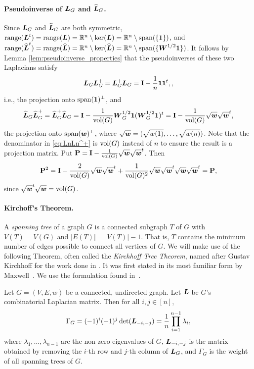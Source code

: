 \paragraph{Pseudoinverse of \texorpdfstring{$\vb*{L}_G$}{the combinatorial} and \texorpdfstring{$\widehat{\vb*{L}}_G$}{normalized Laplacian}.}
Since $\vb*{L}_G$ and $\widehat{\vb*{L}}_G$ are both symmetric, $\textnormal{range}(\vb*{L}^t)=\textnormal{range}(\vb*{L})=\mathbb{R}^n \setminus \ker(\vb*{L})=\mathbb{R}^n \setminus \textnormal{span}(\{\vb{1}\})$, and $\textnormal{range}(\widehat{\vb*{L}}^t)=\textnormal{range}(\widehat{\vb*{L}})=\mathbb{R}^n \setminus \ker(\widehat{\vb*{L}})=\mathbb{R}^n \setminus \textnormal{span}(\{\vb*{W}^{1/2}\vb{1}\})$. It follows by Lemma \ref{lem:pseudoinverse_properties} that the pseudoinverses of these two Laplacians satisfy
\begin{equation}
\label{eq:LL^+}
\vb*{L}_G\vb*{L}_G^+ = \vb*{L}_G^+\vb*{L}_G = \vb{I} - \frac{1}{n}\vb{1}\vb{1}^t,,
\end{equation}
i.e., the projection onto $\textnormal{span}(\vb{1})^\perp$, and 
\begin{equation}
\label{eq:LnLn^+}
\widehat{\vb*{L}}_G\widehat{\vb*{L}}_G^+ = \widehat{\vb*{L}}_G^+\widehat{\vb*{L}}_G = \vb{I} - \frac{1}{\textnormal{vol}(G)}\vb*{W}_G^{1/2}\vb{1}(\vb*{W}_G^{1/2}\vb{1})^t = \vb{I}-\frac{1}{\textnormal{vol}(G)}\sqrt{\vb*{w}}\sqrt{\vb*{w}}^t,
\end{equation}
the projection onto $\textnormal{span}(\vb*{w})^\perp$, where $\sqrt{\vb*{w}}=(\sqrt{w(1)},\dots,\sqrt{w(n)})$. Note that the denominator in \eqref{eq:LnLn^+} is $\textnormal{vol}(G)$ instead of $n$ to ensure the result is a projection matrix. Put $\vb{P} = \vb{I}-\frac{1}{\textnormal{vol}(G)}\sqrt{\vb*{w}}\sqrt{\vb*{w}}^t$. Then 
\begin{align*}
\vb{P}^2 = \vb{I} - \frac{2}{\textnormal{vol}(G)}\sqrt{\vb*{w}}\sqrt{\vb*{w}}^t + \frac{1}{\textnormal{vol}(G)^2}\sqrt{\vb*{w}}\sqrt{\vb*{w}}^t\sqrt{\vb*{w}}\sqrt{\vb*{w}}^t = \vb{P},
\end{align*}
since $\sqrt{\vb*{w}}^t\sqrt{\vb*{w}}= \textnormal{vol}(G)$. 



\paragraph{Kirchoff's  Theorem. }
A  \emph{spanning tree} of a graph $G$ is a connected subgraph $T$ of $G$ with $V(T)=V(G)$ and $|E(T)| = |V(T)|-1$. That  is, $T$ contains the minimum number of edges possible to connect all vertices of $G$.   
We will make use  of the following Theorem, often  called the \emph{Kirchhoff Tree Theorem}, named after Gustav Kirchhoff for the work done in \cite{Kirchhoff1847}. It was first stated in its most familiar form by Maxwell~\cite{maxwell1873treatise}. We use the formulation found in~\cite{chaiken1978matrix}. 

\begin{theorem}
	\label{thm:matrix_tree_theorem}
	Let $G=(V,E,w)$ be a connected, undirected graph. Let $\vb*{L}$ be $G$'s combinatorial Laplacian matrix. Then for all $i,j\in[n]$, 
	\[\Gamma_G = (-1)^i(-1)^j \det(\vb*{L}_{-i,-j}) = \frac{1}{n}\prod_{i=1}^{n-1} \lambda_i,\]
	where $\lambda_1,\dots,\lambda_{n-1}$ are the non-zero eigenvalues of $G$, $\vb*{L}_{-i,-j}$ is the matrix obtained by removing the $i$-th row and $j$-th column of $\vb*{L}_G$, and $\Gamma_G$ is the weight of all spanning trees of $G$.  
\end{theorem}

